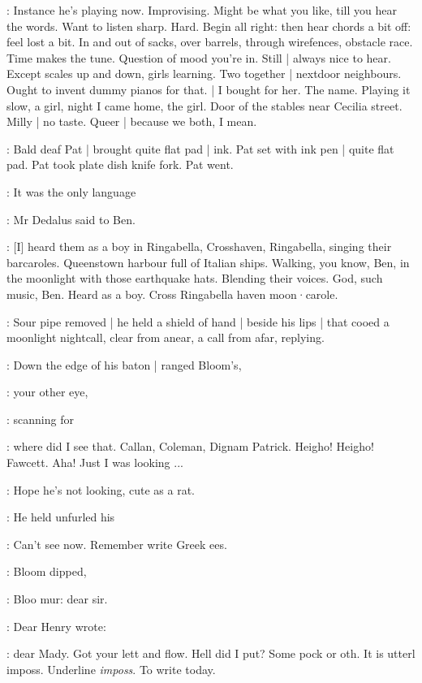 \BloomIntA:
Instance he's playing now.
Improvising.
Might be what you like,
till you hear the words.
Want to listen sharp.
Hard.
Begin all right:
then hear chords a bit off:
feel lost a bit.
In and out of sacks,
over barrels,
through wirefences,
obstacle race.
Time makes the tune.
Question of mood you're in.
Still |
always nice to hear.
Except scales up and down,
girls learning.
Two together |
nextdoor neighbours.
Ought to invent dummy pianos for that.
 |
I bought for her.
The name.
Playing it slow,
a girl,
night I came home,
the girl.
Door of the stables near Cecilia street.
Milly |
no taste.
Queer |
because we both,
I mean.

:
Bald deaf Pat |
brought quite flat pad |
ink.
Pat set with ink pen |
quite flat pad.
Pat took plate dish knife fork.
Pat went.

\simon:
It was the only language

:
Mr Dedalus said to Ben.

\simon:
[I] heard them as a boy in Ringabella,
Crosshaven,
Ringabella,
singing their barcaroles.
Queenstown harbour full of Italian ships.
Walking,
you know,
Ben,
in the moonlight with those earthquake hats.
Blending their voices.
God,
such music,
Ben.
Heard as a boy.
Cross Ringabella haven moon·carole.

:
Sour pipe removed |
he held a shield of hand |
beside his lips |
that cooed a moonlight nightcall,
clear from anear,
a call from afar,
replying.

:
Down the edge of his  baton |
ranged Bloom's,

:
your other eye,

:
scanning for

\BloomIntA:
where did I see that.
Callan,
Coleman,
Dignam Patrick.
Heigho!
Heigho!
Fawcett.
Aha!
Just I was looking ...

\BloomIntA:
Hope he's not looking,
cute as a rat.

:
He held unfurled his 

\BloomIntA:
Can't see now.
Remember write Greek ees.

:
Bloom dipped,

\BloomIntA:
Bloo mur:
dear sir.

:
Dear Henry wrote:

\BloomIntA:
dear Mady.
Got your lett and flow.
Hell did I put?
Some pock or oth.
It is utterl imposs.
Underline \emph{imposs}.
To write today.

